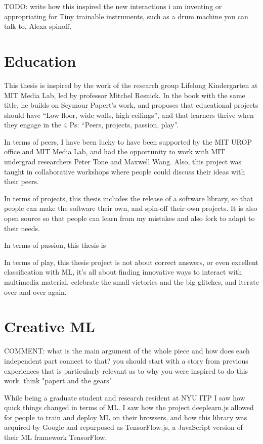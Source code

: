 TODO: write how this inspired the new interactions i am inventing or appropriating for Tiny trainable instruments, such as a drum machine you can talk to, Alexa spinoff.

\section{Education}

This thesis is inspired by the work of the research group Lifelong Kindergarten at MIT Media Lab, led by professor Mitchel Resnick. In the book with the same title, he builds on Seymour Papert’s work, and proposes that educational projects should have “Low floor, wide walls, high ceilings”, and that learners thrive when they engage in the 4 Ps: “Peers, projects, passion, play”.

In terms of peers, I have been lucky to have been supported by the MIT UROP office and MIT Media Lab, and had the opportunity to work with MIT undergrad researchers Peter Tone and Maxwell Wang. Also, this project was taught in collaborative workshops where people could discuss their ideas with their peers.

In terms of projects, this thesis includes the release of a software library, so that people can make the software their own, and spin-off their own projects. It is also open source so that people can learn from my mistakes and also fork to adapt to their needs.

In terms of passion, this thesis is 

In terms of play, this thesis project is not about correct answers, or even excellent classification with \acrshort{ML}, it's all about finding innovative ways to interact with multimedia material, celebrate the small victories and the big glitches, and iterate over and over again.

\section{Creative ML}

COMMENT: what is the main argument of the whole piece and how does each independent part connect to that? you should start with a story from previous experiences that is particularly relevant as to why you were inspired to do this work. think "papert and the gears"

While being a graduate student and research resident at \acrshort{NYU} \acrshort{ITP} I saw how quick things changed in terms of \acrshort{ML}. I saw how the project deeplearn.js allowed for people to train and deploy \acrshort{ML} on their browsers, and how this library was acquired by Google and repurposed as TensorFlow.js, a JavaScript version of their \acrshort{ML} framework TensorFlow.

